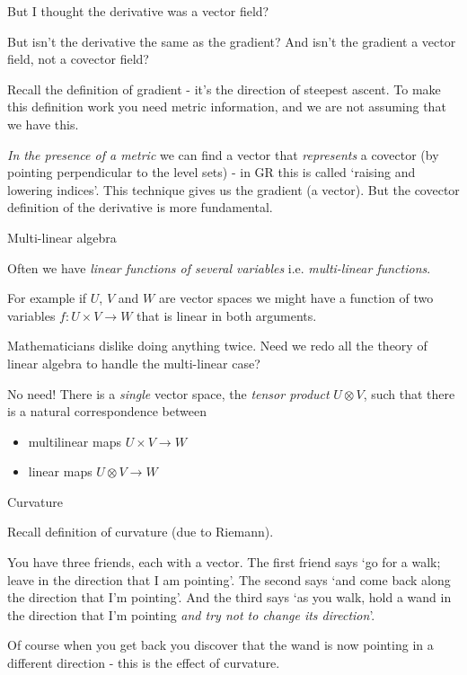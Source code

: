 \documentclass{beamer}
\begin{document}
\begin{frame}{But I thought the derivative was a vector field?}

But isn't the derivative the same as the gradient? And isn't the gradient a vector field, not a covector field?

Recall the definition of gradient - it's the direction of steepest ascent. To make this definition work you need metric information, and we are not assuming that we have this.

\textit{In the presence of a metric} we can find a vector that \textit{represents} a covector (by pointing perpendicular to the level sets) - in GR this is called `raising and lowering indices'. This technique gives us the gradient (a vector). But the covector definition of the derivative is more fundamental.

\end{frame}

\begin{frame}{Multi-linear algebra}

Often we have \textit{linear functions of several variables} i.e. \textit{multi-linear functions}.

For example if $U$, $V$ and $W$ are vector spaces we might have a function of two variables $f \colon U \times V \to W$ that is linear in both arguments.

Mathematicians dislike doing anything twice. Need we redo all the theory of linear algebra to handle the multi-linear case?

No need! There is a \textit{single} vector space, the \textit{tensor product} $U \otimes V$, such that there is a natural correspondence between
\begin{itemize}
\item{multilinear maps $U \times V \to W$}
\item{linear maps $U \otimes V \to W$}
\end{itemize}

\end{frame}

\begin{frame}{Curvature}

Recall definition of curvature (due to Riemann).

You have three friends, each with a vector. The first friend says `go for a walk; leave in the direction that I am pointing'. The second says `and come back along the direction that I'm pointing'. And the third says `as you walk, hold a wand in the direction that I'm pointing \textit{and try not to change its direction}'.

Of course when you get back you discover that the wand is now pointing in a different direction - this is the effect of curvature.

\end{frame}
\end{document}
